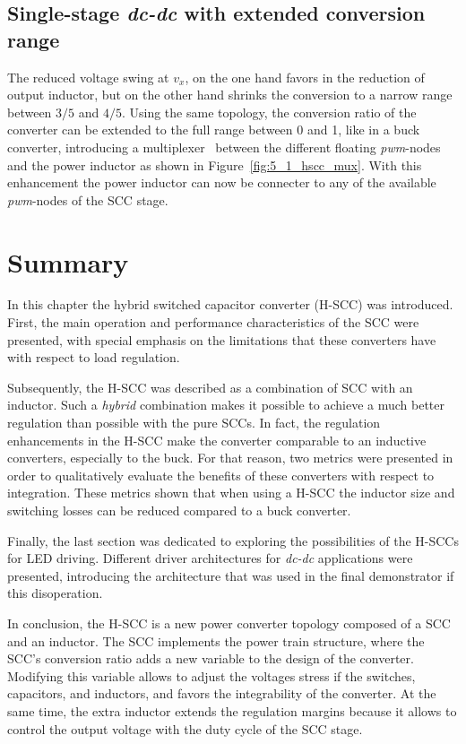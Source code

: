\subsection{Single-stage \emph{dc-dc} with extended conversion range }

The reduced voltage swing at $v_x$, on the one hand favors in the reduction of output inductor, but on the other hand shrinks the conversion to a narrow range between $3/5$ and $4/5$. Using the same topology, the conversion ratio of the converter can be extended to the full range between 0 and 1, like in a buck converter, introducing a multiplexer~\cite{WO2015/040517} between the different floating \emph{pwm}-nodes and the power inductor as shown in Figure~\ref{fig:5_1_hscc_mux}. With this enhancement the power inductor can now be connecter to any of the available \emph{pwm}-nodes of the SCC stage.


\section{Summary}

In this chapter the hybrid switched capacitor converter (H-SCC) was introduced. First, the main operation and performance characteristics of the SCC were presented, with special emphasis on the limitations that these converters have with respect to load  regulation.

Subsequently, the H-SCC was described as a combination of SCC with an inductor. Such a \emph{hybrid} combination makes it possible to achieve a much better regulation than possible with the pure SCCs. In fact, the regulation enhancements in the H-SCC make the converter comparable to an inductive converters, especially to the buck. For that reason, two metrics were presented in order to qualitatively evaluate the benefits of these converters with respect to integration. These metrics shown that when using a H-SCC the inductor size and switching losses can be reduced compared to a buck converter.

Finally, the last section was dedicated to exploring the possibilities of the H-SCCs for LED driving. Different driver architectures for \emph{dc-dc} applications were presented, introducing the architecture that was used in the final demonstrator if this disoperation.

In conclusion, the H-SCC is a new power converter topology composed of a SCC and an inductor. The SCC implements the power train structure, where the SCC's conversion ratio adds a new variable to the design of the converter. Modifying this variable allows to adjust the voltages stress if the switches, capacitors, and inductors, and favors the integrability of the converter. At the same time, the extra inductor extends the regulation margins because it allows to control the output voltage with the duty cycle of the SCC stage.


\clearpage

 